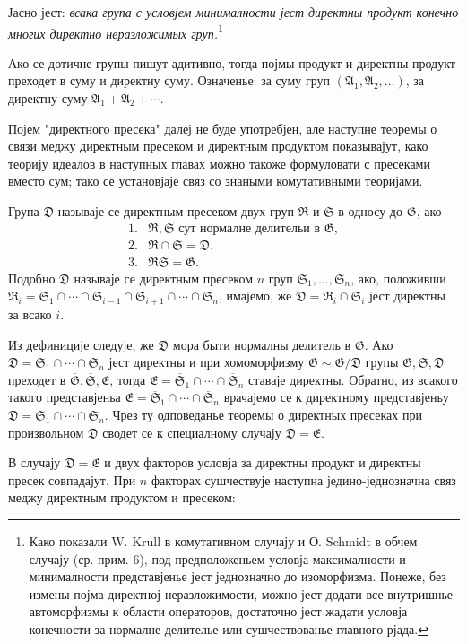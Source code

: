 ﻿\documentclass[11pt]{article}
\providecommand{\mG}{\mathfrak{G}}
\providecommand{\mA}{\mathfrak{A}}
\providecommand{\mE}{\mathfrak{E}}
\providecommand{\mD}{\mathfrak{D}}
\providecommand{\mR}{\mathfrak{R}}
\providecommand{\mS}{\mathfrak{S}}
\begin{document}
Јасно јест: \emph{всака група с условјем минималности јест директны продукт конечно многих директно неразложимых груп.}\footnote{Како показали W. Krull в комутативном случају и О. Schmidt в обчем случају (ср. прим. 6), под предположеньем условја максималности и минималности представјенье јест једнозначно до изоморфизма. Понеже, без измены појма директној неразложимости, можно јест додати все внутришнье автоморфизмы к области операторов, достаточно јест жадати условја конечности за нормалне делителье или сушчествованье главного рјада.}

Ако се дотичне групы пишут адитивно, тогда појмы продукт и директны продукт преходет в суму и директну суму. Означенье: за суму груп $(\mA_1,\mA_2,\ldots)$, за директну суму $\mA_1+\mA_2+\cdots$.

Појем "директного пресека" далеј не буде употребјен, але наступне теоремы о связи меджу директным пресеком и директным продуктом показывајут, како теорију идеалов в наступных главах можно такоже формуловати с пресеками вместо сум; тако се установјаје связ со знаными комутативными теоријами.

Група $\mD$ называје се директным пресеком двух груп $\mR$ и $\mS$ в односу до $\mG$, ако
\[
\begin{array}{ll}
1.& \mR,\mS\text{ сут нормалне делительи в }\mG,\\
2.& \mR\cap\mS=\mD,\\
3.& \mR\mS=\mG.
\end{array}
\]
Подобно $\mD$ называје се директным пресеком $n$ груп $\mS_1,\ldots,\mS_n$, ако, положивши $\mR_i=\mS_1\cap\cdots\cap\mS_{i-1}\cap\mS_{i+1}\cap\cdots\cap\mS_n$, имајемо, же $\mD=\mR_i\cap\mS_i$ јест директны за всако $i$.

Из дефиниције следује, же $\mD$ мора быти нормалны делитель в $\mG$. Ако $\mD=\mS_1\cap\cdots\cap\mS_n$ јест директны и при хомоморфизму $\mG\sim\mG/\mD$ групы $\mG,\mS,\mD$ преходет в $\overline{\mG},\overline{\mS},\mE$, тогда $\mE=\overline{\mS}_1\cap\cdots\cap\overline{\mS}_n$ ставаје директны. Обратно, из всакого такого представјеньа $\mE=\overline{\mS}_1\cap\cdots\cap\overline{\mS}_n$ врачајемо се к директному представјеньу $\mD=\mS_1\cap\cdots\cap\mS_n$. Чрез ту одповеданье теоремы о директных пресеках при произвольном $\mD$ сводет се к специалному случају $\mD=\mE$.

В случају $\mD=\mE$ и двух факторов условја за директны продукт и директны пресек совпадајут. При $n$ факторах сушчествује наступна једино-једнозначна связ меджу директным продуктом и пресеком:
\end{document}
